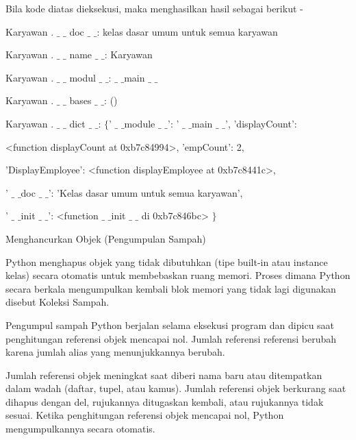 \vspace{12pt}
\vspace{12pt}
Bila kode diatas dieksekusi, maka menghasilkan hasil sebagai berikut - \par
\vspace{12pt}
Karyawan . $  \_  $ $  \_  $ doc $  \_  $ $  \_  $: kelas dasar umum untuk semua karyawan \par
Karyawan . $  \_  $ $  \_  $ name $  \_  $ $  \_  $: Karyawan \par
Karyawan . $  \_  $ $  \_  $ modul $  \_  $ $  \_  $:  $  \_  $ $  \_  $main $  \_  $ $  \_  $ \par
Karyawan . $  \_  $ $  \_  $ bases $  \_  $ $  \_  $: () \par
Karyawan . $  \_  $ $  \_  $ dict $  \_  $ $  \_  $:  $  \{  $' $  \_  $ $  \_  $module $  \_  $ $  \_  $': ' $  \_  $ $  \_  $main $  \_  $ $  \_  $', 'displayCount': \par
<function displayCount at 0xb7c84994>, 'empCount': 2, \par
'DisplayEmployee': <function displayEmployee at 0xb7c8441c>, \par
' $  \_  $ $  \_  $doc $  \_  $ $  \_  $': 'Kelas dasar umum untuk semua karyawan', \par
' $  \_  $ $  \_  $init $  \_  $ $  \_  $': <function  $  \_  $ $  \_  $init $  \_  $ $  \_  $ di 0xb7c846bc> $  \}  $ \par
\vspace{12pt}
Menghancurkan Objek (Pengumpulan Sampah) \par
\vspace{12pt}
Python menghapus objek yang tidak dibutuhkan (tipe built-in atau instance kelas) secara otomatis untuk membebaskan ruang memori. Proses dimana Python secara berkala mengumpulkan kembali blok memori yang tidak lagi digunakan disebut Koleksi Sampah. \par
\vspace{12pt}
Pengumpul sampah Python berjalan selama eksekusi program dan dipicu saat penghitungan referensi objek mencapai nol. Jumlah referensi referensi berubah karena jumlah alias yang menunjukkannya berubah. \par
\vspace{12pt}
Jumlah referensi objek meningkat saat diberi nama baru atau ditempatkan dalam wadah (daftar, tupel, atau kamus). Jumlah referensi objek berkurang saat dihapus dengan del, rujukannya ditugaskan kembali, atau rujukannya tidak sesuai. Ketika penghitungan referensi objek mencapai nol, Python mengumpulkannya secara otomatis. \par
